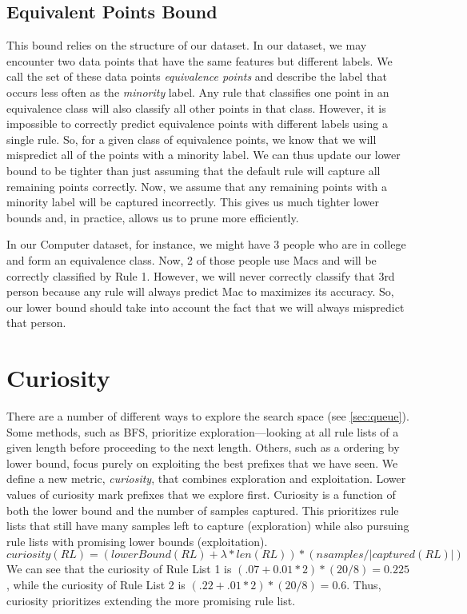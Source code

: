 \subsection{Equivalent Points Bound}
This bound relies on the structure of our dataset.
In our dataset, we may encounter two data points that have the same features but different labels.
We call the set of these data points \textit{equivalence points} and describe the label that occurs less often as the \textit{minority} label.
Any rule that classifies one point in an equivalence class will also classify all other points in that class.
However, it is impossible to correctly predict equivalence points with different labels using a single rule.
So, for a given class of equivalence points, we know that we will mispredict all of the points with a minority label.
We can thus update our lower bound to be tighter than just assuming that the default rule will capture all remaining points correctly.
Now, we assume that any remaining points with a minority label will be captured incorrectly.
This gives us much tighter lower bounds and, in practice, allows us to prune more efficiently.

In our Computer dataset, for instance, we might have 3 people who are in college and form an equivalence class.
Now, 2 of those people use Macs and will be correctly classified by Rule 1.
However, we will never correctly classify that 3rd person because any rule will always predict Mac to maximizes its accuracy.
So, our lower bound should take into account the fact that we will always mispredict that person.

\section{Curiosity}
There are a number of different ways to explore the search space (see \ref{sec:queue}).
Some methods, such as BFS, prioritize exploration---looking at all rule lists of a given length before proceeding to the next length.
Others, such as a ordering by lower bound, focus purely on exploiting the best prefixes that we have seen.
We define a new metric, \textit{curiosity}, that combines exploration and exploitation.
Lower values of curiosity mark prefixes that we explore first.
Curiosity is a function of both the lower bound and the number of samples captured.
This prioritizes rule lists that still have many samples left to capture (exploration) while also pursuing rule lists with promising lower bounds (exploitation).
$$curiosity(RL) = (lowerBound(RL) + \lambda * len(RL))  * (nsamples / |captured(RL)|)$$
We can see that the curiosity of Rule List 1 is $(.07 + 0.01 * 2) * (20 / 8) = 0.225$, while the curiosity of Rule List 2 is $(.22 + .01 * 2) * (20 / 8) = 0.6$.
Thus, curiosity prioritizes extending the more promising rule list.


